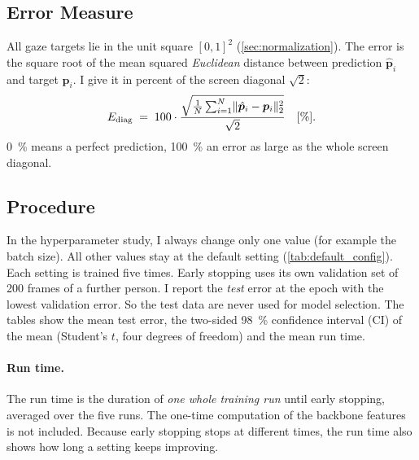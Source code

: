 \subsection{Error Measure}
\label{sec:metric}

All gaze targets lie in the unit square $[0,1]^2$ (\cref{sec:normalization}).
The error is the square root of the mean squared \emph{Euclidean} distance
between prediction $\hat{\bm p}_i$ and target $\bm p_i$. I give it in percent of
the screen diagonal $\sqrt{2}$:
\begin{equation}
  E_{\mathrm{diag}} \;=\; 100\cdot
  \frac{\sqrt{\frac{1}{N}\sum_{i=1}^{N}\lVert\hat{\bm p}_i-\bm p_i\rVert_2^{2}}}{\sqrt{2}}
  \quad[\%].
  \label{eq:ediag}
\end{equation}
\SI{0}{\percent} means a perfect prediction, \SI{100}{\percent} an error as
large as the whole screen diagonal.

\subsection{Procedure}
\label{sec:protocol}

In the hyperparameter study, I always change only one value (for example the batch size). All other values
stay at the default setting (\cref{tab:default_config}). Each setting is
trained five times. Early stopping uses its own validation set of 200 frames of
a further person. I report the \emph{test} error at the epoch with the lowest
validation error. So the test data are never used for model selection. The
tables show the mean test error, the two-sided \SI{98}{\percent} confidence
interval (CI) of the mean (Student's $t$, four degrees of freedom) and the mean
run time.

\paragraph{Run time.} The run time is the duration of \emph{one whole
training run} until early stopping, averaged over the five runs. The one-time
computation of the backbone features is not included. Because early stopping
stops at different times, the run time also shows how long a setting keeps
improving.


